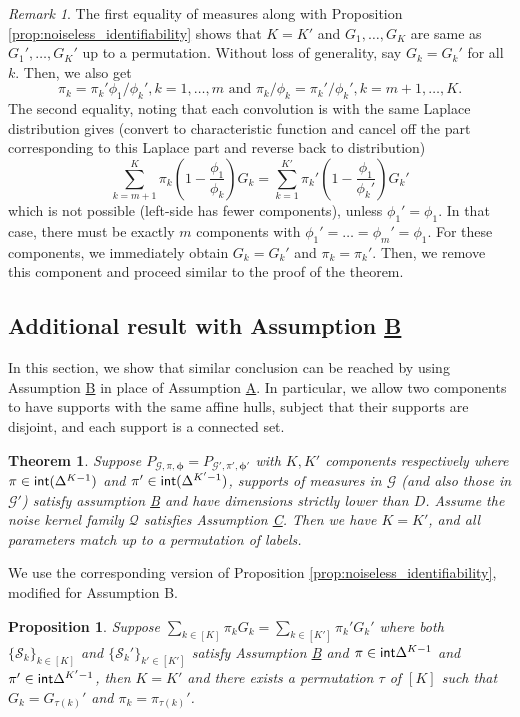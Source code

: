 \documentclass[bj,authoryear]{imsart}
\theoremstyle{plain}
\newtheorem{theorem}{Theorem}
\newtheorem{proposition}{Proposition}
\theoremstyle{remark}
\newtheorem{remark}{Remark}
\def\bphi{{\boldsymbol\phi}}
\def\cG{\mathcal{G}}
\def\cQ{\mathcal{Q}}
\def\cS{\mathcal{S}}
\def\intr{{\sf int}}
\begin{document}
\begin{appendix}
\begin{remark}
    The first equality of measures along with Proposition \ref{prop:noiseless_identifiability} shows that $K=K'$ and $G_1,\dots,G_K$ are same as $G_1',\dots,G_K'$ up to a permutation. Without loss of generality, say $G_k=G_k'$ for all $k$. Then, we also get
    $$\pi_k = \pi_k'\phi_1/\phi_k', k=1,\dots, m \text{ and } \pi_k/\phi_k = \pi_k'/\phi_k', k=m+1,\dots,K.$$
    The second equality, noting that each convolution is with the same Laplace distribution gives (convert to characteristic function and cancel off the part corresponding to this Laplace part and reverse back to distribution)
    $$\sum_{k=m+1}^K  \pi_k\left(1-\frac{\phi_1}{\phi_k}\right)G_k =\sum_{k=1}^{K'}  \pi_k'\left(1-\frac{\phi_1}{\phi_k'}\right)G_k'$$
    which is not possible (left-side has fewer components), unless $\phi_1'=\phi_1$. In that case, there must be exactly $m$ components with $\phi_1'=\dots=\phi_m'=\phi_1$. For these components, we immediately obtain $G_k=G_k'$ and $\pi_k=\pi_k'$. Then, we remove this component and proceed similar to the proof of the theorem.
\end{remark}

\subsection{Additional result with Assumption \hyperref[assume:B]{B}}
\label{app: relax assumption A}

In this section, we show that similar conclusion can be reached by using Assumption \hyperref[assume:B]{B} in place of Assumption \hyperref[assume:A]{A}. In particular, we allow two components to have supports with the same affine hulls, subject that their supports are disjoint, and each support is a connected set. 
\begin{theorem}\label{thm:isotropic_identifiability b}
Suppose $P_{\cG,\pi,\bphi} = P_{\cG',\pi',\bphi'}$ with $K, K'$ components respectively where $\pi\in\intr (\Delta^{K-1})$ and $ \pi'\in\intr (\Delta^{K'-1})$, supports of measures in $\cG$ (and also those in $\cG'$) satisfy assumption \hyperref[assume:B]{B} and have dimensions strictly lower than $D$. Assume the noise kernel family $\cQ$ satisfies Assumption \hyperref[assume:C]{C}. Then we have $K=K'$, and all parameters match up to a permutation of labels.
\end{theorem}

We use the corresponding version of Proposition \ref{prop:noiseless_identifiability}, modified for Assumption B.

    \begin{proposition}\label{prop:noiseless_identifiability b}
Suppose $\sum_{k\in[K]} \pi_k G_k = \sum_{k\in[K']} \pi_k' G_k'$ where both $\{\cS_k\}_{k\in[K]}$ and $\{\cS_{k}'\}_{k'\in[K']}$ satisfy Assumption \hyperref[assume:B]{B} and $\pi\in \intr \Delta^{K-1}$ and $\pi'\in\intr \Delta^{K'-1}$, then $K=K'$ and there exists a permutation $\tau$ of $[K]$ such that $G_k=G_{\tau(k)}'$ and $\pi_k=\pi_{\tau(k)}'$.
\end{proposition}


\end{appendix}
\end{document}
